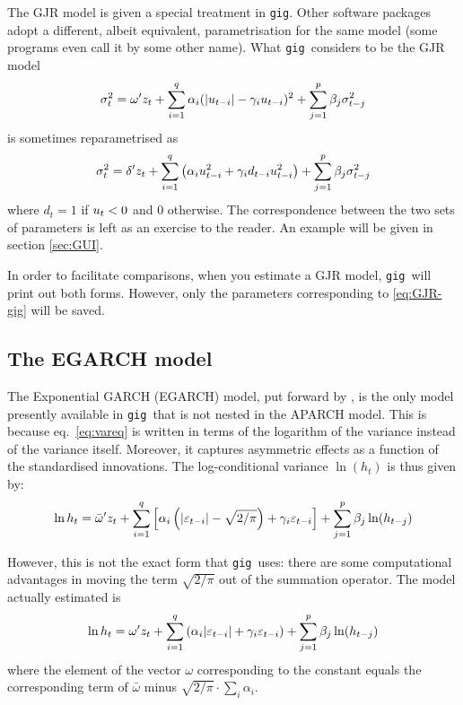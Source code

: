 \documentclass[a4paper,11pt]{article}
\newcommand{\stdu}{\ensuremath \varepsilon}
\newcommand{\uhat}{\ensuremath u}
\newcommand{\gig}{\texttt{gig}}
\begin{document}
The GJR model is given a special treatment in \gig. Other software
packages adopt a different, albeit equivalent, parametrisation for the
same model (some programs even call it by some other name). What \gig\
considers to be the GJR model
\begin{equation} \label{eq:GJR-gig} \sigma_t^2 = \omega'z_t +
  \sum_{i=1}^q \alpha_i(|\uhat_{t-i}| - \gamma_i
  \uhat_{t-i})^2 + \sum_{j=1}^p\beta_j\sigma_{t-j}^2
\end{equation}
is sometimes reparametrised as
\begin{equation} \label{eq:GJR-eviews} \sigma_t^2 = \delta'z_t +
  \sum_{i=1}^q \left( \alpha_i \uhat_{t-i}^2 + \gamma_i d_{t-i}
  \uhat_{t-i}^2 \right) + \sum_{j=1}^p\beta_j\sigma_{t-j}^2
\end{equation}
where $d_t = 1$ if $\uhat_{t}<0$ and 0 otherwise. The correspondence
between the two sets of parameters is left as an exercise to the
reader. An example will be given in section \ref{sec:GUI}.

In order to facilitate comparisons, when you estimate a GJR model,
\gig\ will print out both forms. However, only the parameters
corresponding to \eqref{eq:GJR-gig} will be saved.

\subsection{The EGARCH model}
\label{sec:EGARCH}

The Exponential GARCH (EGARCH) model, put forward by \cite{Nelson}, is
the only model presently available in \gig\ that is not nested
in the APARCH model. This is because eq.~\eqref{eq:vareq} is written
in terms of the logarithm of the variance instead of the variance
itself. Moreover, it captures asymmetric effects as a function of the
standardised innovations. The log-conditional variance $\ln(h_t)$ is
thus given by:
\begin{equation}\label{eq:egarch-0}
  \ln h_t = \bar{\omega}'z_t  + 
  \sum_{i=1}^q \left[
    \alpha_i \left( |\stdu_{t-i}| - \sqrt{2/\pi}\right) + \gamma_i \stdu_{t-i}
  \right]+
  \sum_{j=1}^p \beta_j \ln(h_{t-j})
\end{equation}

However, this is not the exact form that \gig\ uses: there are some
computational advantages in moving the term $\sqrt{2/\pi}$ out of the
summation operator. The model actually estimated is
\begin{equation}\label{eq:egarch}
  \ln h_t = \omega'z_t  + 
  \sum_{i=1}^q \left( \alpha_i |\stdu_{t-i}| + \gamma_i \stdu_{t-i} \right)+
  \sum_{j=1}^p \beta_j \ln(h_{t-j})
\end{equation}
where the element of the vector $\omega$ corresponding to the constant
equals the corresponding term of $\bar{\omega}$ minus $\sqrt{2/\pi}
\cdot \sum_{i} \alpha_i$.
\end{document}
